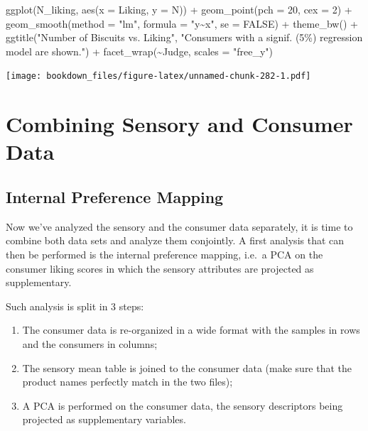 \documentclass[
]{krantz}
\makeatletter
\newenvironment{Shaded}{\begin{snugshade}}{\end{snugshade}}
\newcommand{\AttributeTok}[1]{\textcolor[rgb]{0.61,0.61,0.61}{#1}}
\newcommand{\ConstantTok}[1]{\textcolor[rgb]{0,0,0}{#1}}
\newcommand{\DecValTok}[1]{\textcolor[rgb]{0.06,0.06,0.06}{#1}}
\newcommand{\FunctionTok}[1]{\textcolor[rgb]{0,0,0}{#1}}
\newcommand{\NormalTok}[1]{#1}
\newcommand{\SpecialCharTok}[1]{\textcolor[rgb]{0,0,0}{#1}}
\newcommand{\StringTok}[1]{\textcolor[rgb]{0.5,0.5,0.5}{#1}}
\providecommand{\tightlist}{%
  \setlength{\itemsep}{0pt}\setlength{\parskip}{0pt}}
\newenvironment{kframe}{%
\medskip{}
\setlength{\fboxsep}{.8em}
 \def\at@end@of@kframe{}%
 \ifinner\ifhmode%
  \def\at@end@of@kframe{\end{minipage}}%
  \begin{minipage}{\columnwidth}%
 \fi\fi%
 \def\FrameCommand##1{\hskip\@totalleftmargin \hskip-\fboxsep
 \colorbox{shadecolor}{##1}\hskip-\fboxsep
     \hskip-\linewidth \hskip-\@totalleftmargin \hskip\columnwidth}%
 \MakeFramed {\advance\hsize-\width
   \@totalleftmargin\z@ \linewidth\hsize
   \@setminipage}}%
 {\par\unskip\endMakeFramed%
 \at@end@of@kframe}
\renewenvironment{Shaded}{\begin{kframe}}{\end{kframe}}
\makeatother
\begin{document}
\begin{Shaded}
\begin{Highlighting}[]
\FunctionTok{ggplot}\NormalTok{(N\_liking, }\FunctionTok{aes}\NormalTok{(}\AttributeTok{x =}\NormalTok{ Liking, }\AttributeTok{y =}\NormalTok{ N)) }\SpecialCharTok{+}
  \FunctionTok{geom\_point}\NormalTok{(}\AttributeTok{pch =} \DecValTok{20}\NormalTok{, }\AttributeTok{cex =} \DecValTok{2}\NormalTok{) }\SpecialCharTok{+}
  \FunctionTok{geom\_smooth}\NormalTok{(}\AttributeTok{method =} \StringTok{"lm"}\NormalTok{, }\AttributeTok{formula =} \StringTok{"y\textasciitilde{}x"}\NormalTok{, }\AttributeTok{se =} \ConstantTok{FALSE}\NormalTok{) }\SpecialCharTok{+}
  \FunctionTok{theme\_bw}\NormalTok{() }\SpecialCharTok{+}
  \FunctionTok{ggtitle}\NormalTok{(}\StringTok{"Number of Biscuits vs. Liking"}\NormalTok{, }
          \StringTok{"Consumers with a signif. (5\%) regression model are shown."}\NormalTok{) }\SpecialCharTok{+}
  \FunctionTok{facet\_wrap}\NormalTok{(}\SpecialCharTok{\textasciitilde{}}\NormalTok{Judge, }\AttributeTok{scales =} \StringTok{"free\_y"}\NormalTok{)}
\end{Highlighting}
\end{Shaded}

\texttt{[image: bookdown\_files/figure-latex/unnamed-chunk-282-1.pdf]}

\hypertarget{combining-sensory-and-consumer-data}{%
\section{Combining Sensory and Consumer Data}\label{combining-sensory-and-consumer-data}}

\hypertarget{internal-preference-mapping}{%
\subsection{Internal Preference Mapping}\label{internal-preference-mapping}}

Now we've analyzed the sensory and the consumer data separately, it is time to combine both data sets and analyze them conjointly. A first analysis that can then be performed is the internal preference mapping, i.e.~a PCA on the consumer liking scores in which the sensory attributes are projected as supplementary.

Such analysis is split in 3 steps:

\begin{enumerate}
\def\labelenumi{\arabic{enumi}.}
\tightlist
\item
  The consumer data is re-organized in a wide format with the samples in rows and the consumers in columns;
\item
  The sensory mean table is joined to the consumer data (make sure that the product names perfectly match in the two files);
\item
  A PCA is performed on the consumer data, the sensory descriptors being projected as supplementary variables.
\end{enumerate}
\end{document}
